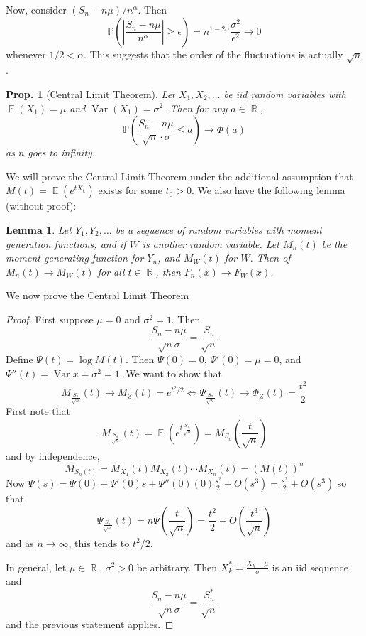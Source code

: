 \documentclass[12pt, a4paper]{book}
\DeclareMathOperator{\R}{\mathbb{R}}
\DeclareMathOperator{\E}{\mathbb{E}}
\DeclareMathOperator{\Var}{Var}
\renewcommand{\Pr}{\mathbb{P}}
\newtheorem{lemma}[theorem]{Lemma}
\newtheorem{proposition}[theorem]{Prop.}
\theoremstyle{nonumberplain}
\newtheorem{proof}{Proof}
\begin{document}
Now, consider $(S_n-n\mu)/n^\alpha$.
Then
\begin{equation*}
    \Pr\left(\left\lvert\frac{S_n-n\mu}{n^\alpha}\right\rvert\geq\epsilon\right)=n^{1-2\alpha}\frac{\sigma^2}{\epsilon^2}\to 0
\end{equation*}
whenever $1/2<\alpha$.
This suggests that the order of the fluctuations is actually $\sqrt{n}$.
\begin{proposition}[Central Limit Theorem]
    Let $X_1,X_2,\ldots$ be iid random variables with $\E(X_1)=\mu$ and $\Var(X_1)=\sigma^2$.
    Then for any $a\in \R$,
    \begin{equation*}
        \Pr\left(\frac{S_n-n\mu}{\sqrt{n}\cdot\sigma}\leq a\right)\to\Phi(a)
    \end{equation*}
    as $n$ goes to infinity.
\end{proposition}
We will prove the Central Limit Theorem under the additional assumption that $M(t)=\E(e^{tX_k})$ exists for some $t_0>0$.
We also have the following lemma (without proof):
\begin{lemma}
    Let $Y_1,Y_2,\ldots$ be a sequence of random variables with moment generation functions, and if $W$ is another random variable.
    Let $M_n(t)$ be the moment generating function for $Y_n$, and $M_W(t)$ for $W$.
    Then of $M_n(t)\to M_W(t)$ for all $t\in\R$, then $F_n(x)\to F_W(x)$.
\end{lemma}
We now prove the Central Limit Theorem
\begin{proof}
    First suppose $\mu=0$ and $\sigma^2=1$.
    Then
    \begin{equation*}
        \frac{S_n-n\mu}{\sqrt{n}\sigma}=\frac{S_n}{\sqrt{n}}
    \end{equation*}
    Define $\Psi(t)=\log M(t)$.
    Then $\Psi(0)=0$, $\Psi'(0)=\mu=0$, and $\Psi''(t)=\Var x=\sigma^2=1$.
    We want to show that
    \begin{equation*}
        M_{\frac{S_n}{\sqrt{n}}}(t)\to M_Z(t)=e^{t^2/2}\Leftrightarrow \Psi_{\frac{S_n}{\sqrt{n}}}(t)\to \Phi_Z(t)=\frac{t^2}{2}
    \end{equation*}
    First note that
    \begin{equation*}
        M_{\frac{S_n}{\sqrt{n}}}(t)=\E\left(e^{t\frac{S_n}{\sqrt{n}}}\right)=M_{S_n}\left(\frac{t}{\sqrt{n}}\right)
    \end{equation*}
    and by independence,
    \begin{equation*}
        M_{S_n(t)}=M_{X_1}(t)M_{X_2}(t)\cdots M_{X_n}(t)=(M(t))^n
    \end{equation*}
    Now $\Psi(s)=\Psi(0)+\Psi'(0)s+\Psi''(0)(0)\frac{s^2}{2}+O(s^3)=\frac{s^2}{2}+O(s^3)$ so that
    \[\Psi_{\frac{S_n}{\sqrt{n}}}(t) = n\Psi\left(\frac{t}{\sqrt{n}}\right)=\frac{t^2}{2}+O\left(\frac{t^3}{\sqrt{n}}\right)\]
    and as $n\to\infty$, this tends to $t^2/2$.

    In general, let $\mu\in\R$, $\sigma^2>0$ be arbitrary.
    Then $X_k^*=\frac{X_k-\mu}{\sigma}$ is an iid sequence and
    \[\frac{S_n-n\mu}{\sqrt{n}\sigma}=\frac{S_n^*}{\sqrt{n}}\]
    and the previous statement applies.
\end{proof}
\end{document}
